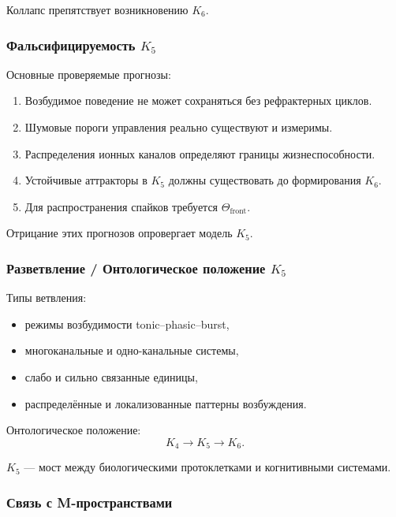Коллапс препятствует возникновению $K_6$.

\subsubsection{Фальсифицируемость \texorpdfstring{$K_5$}{K_5}}

Основные проверяемые прогнозы:
\begin{enumerate}
    \item Возбудимое поведение не может сохраняться без рефрактерных
          циклов.
    \item Шумовые пороги управления реально существуют и измеримы.
    \item Распределения ионных каналов определяют границы жизнеспособности.
    \item Устойчивые аттракторы в $K_5$ должны существовать до формирования
          $K_6$.
    \item Для распространения спайков требуется $\Theta_{\mathrm{front}}$.
\end{enumerate}

Отрицание этих прогнозов опровергает модель $K_5$.

\subsubsection{Разветвление / Онтологическое положение \texorpdfstring{$K_5$}{K_5}}

Типы ветвления:
\begin{itemize}
    \item режимы возбудимости tonic–phasic–burst,
    \item многоканальные и одно-канальные системы,
    \item слабо и сильно связанные единицы,
    \item распределённые и локализованные паттерны возбуждения.
\end{itemize}

Онтологическое положение:
\[
K_4 \to K_5 \to K_6.
\]

$K_5$ — мост между биологическими протоклетками и когнитивными системами.

\subsubsection{Связь с M-пространствами}

